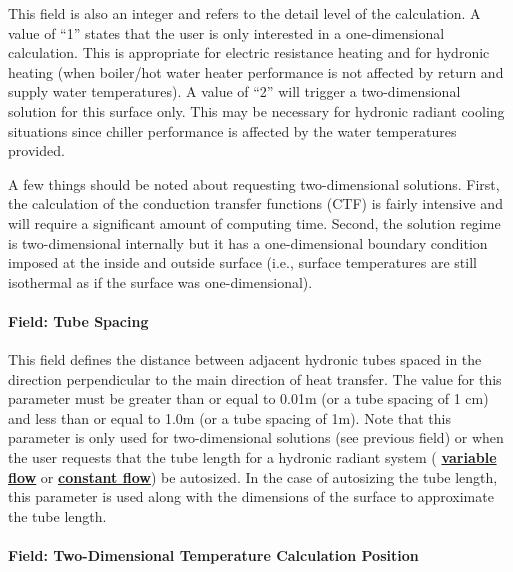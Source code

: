 This field is also an integer and refers to the detail level of the calculation. A value of ``1'' states that the user is only interested in a one-dimensional calculation. This is appropriate for electric resistance heating and for hydronic heating (when boiler/hot water heater performance is not affected by return and supply water temperatures). A value of ``2'' will trigger a two-dimensional solution for this surface only. This may be necessary for hydronic radiant cooling situations since chiller performance is affected by the water temperatures provided.

A few things should be noted about requesting two-dimensional solutions. First, the calculation of the conduction transfer functions (CTF) is fairly intensive and will require a significant amount of computing time. Second, the solution regime is two-dimensional internally but it has a one-dimensional boundary condition imposed at the inside and outside surface (i.e., surface temperatures are still isothermal as if the surface was one-dimensional).

\paragraph{Field: Tube Spacing}\label{field-tube-spacing}

This field defines the distance between adjacent hydronic tubes spaced in the direction perpendicular to the main direction of heat transfer. The value for this parameter must be greater than or equal to 0.01m (or a tube spacing of 1 cm) and less than or equal to 1.0m (or a tube spacing of 1m). Note that this parameter is only used for two-dimensional solutions (see previous field) or when the user requests that the tube length for a hydronic radiant system ( \textbf{\hyperref[zonehvaclowtemperatureradiantvariableflow]{variable flow}} or  \textbf{\hyperref[zonehvaclowtemperatureradiantconstantflow]{constant flow}}) be autosized.  In the case of autosizing the tube length, this parameter is used along with the dimensions of the surface to approximate the tube length.

\paragraph{Field: Two-Dimensional Temperature Calculation Position}\label{field-two-dimensional-temperature-calculation-position}


